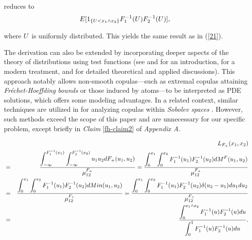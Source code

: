 \documentclass[onecolumn]{article}
\providecommand{\dint}{\displaystyle\int}
\renewcommand{\dint}{\displaystyle\int}
\begin{document}
{\par
{\footnotesize reduces to }%
\begin{equation*}
E[1_{\{U<x_{1}\wedge x_{2}\}}F_{1}^{-1}(U)F_{2}^{-1}(U)],{\footnotesize \ }
\end{equation*}%
\par
{\footnotesize where }$U${\footnotesize \ is uniformly distributed. This
yields the same result as in (\ref{21}).}
\par
{\footnotesize The derivation can also be extended by incorporating deeper
aspects of the theory of distributions using test functions (see \cite{[12]}
and \cite[Chapter 9]{[19]} for an introduction, \cite[Chapter 1]{[21]} for a
modern treatment, and \cite{[15]} for detailed theoretical and applied
discussions). This approach notably allows non-smooth copulas---such as
extremal copulas attaining \textit{Fr\'{e}chet-Hoeffding} \textit{bounds} or
those induced by atoms---to be interpreted as PDE solutions, which offers
some modeling advantages. In a related context, similar techniques are
utilized in \cite{[16]} for analyzing copulas within \textit{Sobolev spaces}%
. However, such methods exceed the scope of this paper and are unnecessary
for our specific problem, except briefly in \textit{Claim }\ref{fh-claim2}
of \textit{Appendix A}.}}%
\begin{eqnarray}
&&L_{F_{+}}(x_{1},x_{2})  \notag \\
&=&\frac{\dint\nolimits_{-\infty
}^{F_{1}^{-1}(x_{1})}\dint\nolimits_{-\infty
}^{F_{2}^{-1}(x_{2})}u_{1}u_{2}dF_{+}(u_{1},u_{2})}{\mu _{12}^{F_{+}}}=\frac{%
\dint\nolimits_{0}^{x_{1}}\dint%
\nolimits_{0}^{x_{2}}F_{1}^{-1}(u_{1})F_{2}^{-1}(u_{2})dM^{F}(u_{1},u_{2})}{%
\mu _{12}^{F_{+}}}  \notag \\
&=&\frac{\dint\nolimits_{0}^{x_{1}}\dint%
\nolimits_{0}^{x_{2}}F_{1}^{-1}(u_{1})F_{2}^{-1}(u_{2})dMin(u_{1},u_{2})}{%
\mu _{12}^{F_{+}}}=\frac{\dint\nolimits_{0}^{x_{1}}\dint%
\nolimits_{0}^{x_{2}}F_{1}^{-1}(u_{1})F_{2}^{-1}(u_{2})\delta
(u_{2}-u_{1})du_{1}du_{2}}{\mu _{12}^{F_{+}}}  \notag \\
&=&\frac{\dint\nolimits_{0}^{x_{1}\wedge x_{2}}F_{1}^{-1}(u)F_{2}^{-1}(u)du}{%
\dint\nolimits_{0}^{1}F_{1}^{-1}(u)F_{2}^{-1}(u)du}.  \label{21}
\end{eqnarray}
\end{document}
